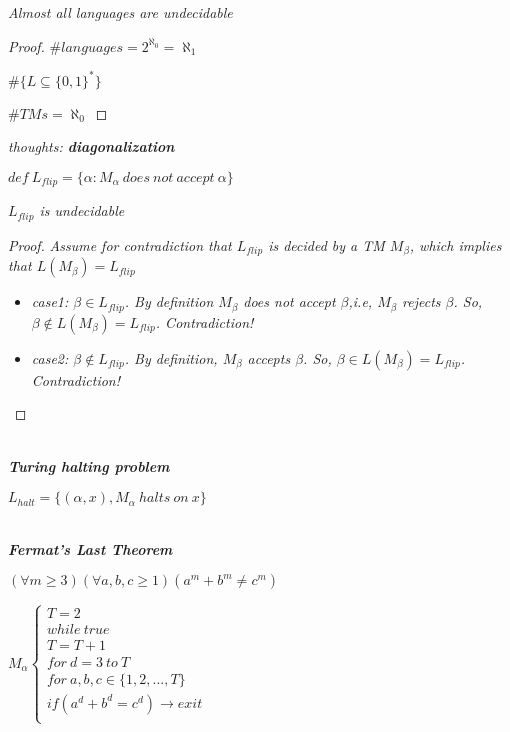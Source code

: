 \documentclass{article}
\begin{document}
\begin{lemma}
    \textit{Almost all languages are undecidable}

    \begin{proof}
        $\# languages = 2^{\aleph_0} = \aleph_1$

        $\#\{L\subseteq\{0,1\}^*\}$

        $\#TMs = \aleph_0$
    \end{proof}
\end{lemma}

\textit{thoughts: \textbf{diagonalization}}

$def~L_{flip} = \{\alpha:M_\alpha ~does~ not~ accept~ \alpha\}$


\begin{lemma}
    \textit{$L_{flip}$ is undecidable}
    \begin{proof}
        \textit{Assume for contradiction that $L_{flip}$ is decided by a TM $M_\beta$, which implies that $L(M_\beta) = L_{flip}$}

        \begin{itemize}
            \item \textit{case1: $\beta\in L_{flip}$. By definition $M_\beta$ does not accept $\beta$,i.e, $M_\beta$ rejects $\beta$. So, $\beta\notin L(M_\beta) = L_{flip}$. Contradiction!}
            \item \textit{case2: $\beta\notin L_{flip}$. By definition, $M_\beta$ accepts $\beta$. So, $\beta\in L(M_\beta) = L_{flip}$. Contradiction!}
        \end{itemize}
    \end{proof}
\end{lemma}

\textit{\\ \textbf{Turing halting problem}}

\textit{$L_{halt} = \{(\alpha,x),M_\alpha ~halts ~on ~x\}$}

\newpage
\textit{\\ \textbf{Fermat's Last Theorem}}

$(\forall m\geq 3)(\forall a,b,c\geq1)(a^m+b^m\neq c^m)$

$M_\alpha\begin{cases}
    T = 2\\
    while ~true\\
    T = T+1\\
    for ~d = 3 ~to~ T\\
    for~ a,b,c\in\{1,2,...,T\}\\
    if(a^d+b^d=c^d)\rightarrow exit\\
\end{cases}$
\end{document}
